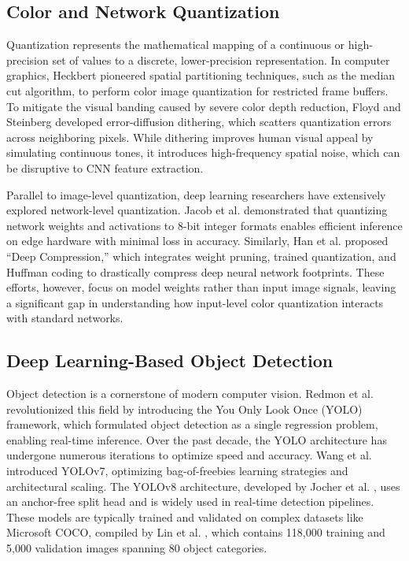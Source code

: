 \documentclass[12pt, a4paper]{article}
\begin{document}
\subsection{Color and Network Quantization}
Quantization represents the mathematical mapping of a continuous or high-precision set of values to a discrete, lower-precision representation. In computer graphics, Heckbert \cite{heckbert1982} pioneered spatial partitioning techniques, such as the median cut algorithm, to perform color image quantization for restricted frame buffers. To mitigate the visual banding caused by severe color depth reduction, Floyd and Steinberg \cite{floyd1976} developed error-diffusion dithering, which scatters quantization errors across neighboring pixels. While dithering improves human visual appeal by simulating continuous tones, it introduces high-frequency spatial noise, which can be disruptive to CNN feature extraction.

Parallel to image-level quantization, deep learning researchers have extensively explored network-level quantization. Jacob et al. \cite{jacob2018} demonstrated that quantizing network weights and activations to 8-bit integer formats enables efficient inference on edge hardware with minimal loss in accuracy. Similarly, Han et al. \cite{han2016} proposed ``Deep Compression,'' which integrates weight pruning, trained quantization, and Huffman coding to drastically compress deep neural network footprints. These efforts, however, focus on model weights rather than input image signals, leaving a significant gap in understanding how input-level color quantization interacts with standard networks.

\subsection{Deep Learning-Based Object Detection}
Object detection is a cornerstone of modern computer vision. Redmon et al. \cite{redmon2016} revolutionized this field by introducing the You Only Look Once (YOLO) framework, which formulated object detection as a single regression problem, enabling real-time inference. Over the past decade, the YOLO architecture has undergone numerous iterations to optimize speed and accuracy. Wang et al. \cite{wang2023} introduced YOLOv7, optimizing bag-of-freebies learning strategies and architectural scaling. The YOLOv8 architecture, developed by Jocher et al. \cite{jocher2023}, uses an anchor-free split head and is widely used in real-time detection pipelines. These models are typically trained and validated on complex datasets like Microsoft COCO, compiled by Lin et al. \cite{lin2014}, which contains 118,000 training and 5,000 validation images spanning 80 object categories.
\end{document}
